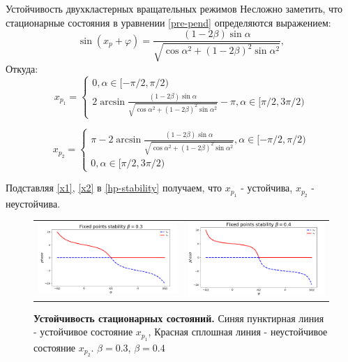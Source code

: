 \begin{chapter}{Устойчивость двухкластерных вращательных режимов}
	Несложно заметить, что стационарные состояния в уравнении \ref{pre-pend} определяются выражением:
	$$
	\sin{(x_p + \varphi)} = \frac{(1 - 2\beta) \sin{\alpha}}{\sqrt{\cos{\alpha}^2 + (1 - 2\beta)^2\sin{\alpha}^2}},
	$$
	Откуда:
	\begin{equation} \label{x1}
		x_{p_1} = \begin{cases}
			0, \alpha \in [-\pi/2, \pi/2) \\
			2\arcsin{\frac{(1 - 2\beta) \sin{\alpha}}{\sqrt{\cos{\alpha}^2 + (1 - 2\beta)^2\sin{\alpha}^2}}} - \pi , \alpha \in [\pi/2, 3\pi/2)
		\end{cases}
	\end{equation}
	
	\begin{equation} \label{x2}
	x_{p_2} = \begin{cases}
		\pi - 2\arcsin{\frac{(1 - 2\beta) \sin{\alpha}}{\sqrt{\cos{\alpha}^2 + (1 - 2\beta)^2\sin{\alpha}^2}}}, \alpha \in [-\pi/2, \pi/2) \\
		0, \alpha \in [\pi/2, 3\pi/2)
		\end{cases}
	\end{equation}
	
	Подставляя \ref{x1}, \ref{x2} в \ref{hp-stability}
	получаем, что $x_{p_1}$ - устойчива, $x_{p_2}$ - неустойчива.

	\begin{figure}[h!]\center
		\begin{tabular}{cc}
		\includegraphics[width=0.54\columnwidth]{pictures/fixed-points.png}
		&
		\includegraphics[width=0.5\columnwidth]{pictures/fixed-points-2.png} 
		\end{tabular}
		\caption{\textbf{Устойчивость стационарных состояний.}
		Синяя пунктирная линия - устойчивое состояние $x_{p_1}$,
		Красная сплошная линия - неустойчивое состояние $x_{p_2}$.
		$\beta = 0.3$, $\beta = 0.4$}
	\end{figure}


\end{chapter}
